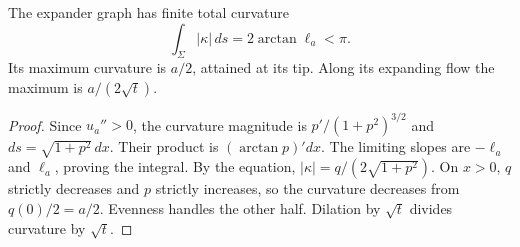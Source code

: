\begin{proposition}\label{prop:expander-curvature-example}
The expander graph has finite total curvature
\[
 \int_\Sigma|\kappa|\,ds=2\arctan\ell_a<\pi.
\]
Its maximum curvature is $a/2$, attained at its tip. Along its expanding flow the maximum is $a/(2\sqrt t)$.
\end{proposition}
\begin{proof}
Since $u_a''>0$, the curvature magnitude is $p'/(1+p^2)^{3/2}$ and $ds=\sqrt{1+p^2}\,dx$. Their product is $(\arctan p)'dx$. The limiting slopes are $-\ell_a$ and $\ell_a$, proving the integral. By the equation, $|\kappa|=q/(2\sqrt{1+p^2})$. On $x>0$, $q$ strictly decreases and $p$ strictly increases, so the curvature decreases from $q(0)/2=a/2$. Evenness handles the other half. Dilation by $\sqrt t$ divides curvature by $\sqrt t$.
\end{proof}

